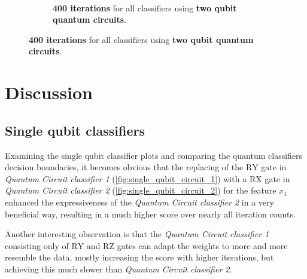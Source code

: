 \begin{figure}[!h]
    \\[1ex]
    \begin{subfigure}{1.0\textwidth}
        \centering
        \caption{\textbf{400 iterations} for all classifiers using \textbf{two qubit quantum circuits}.}
        \label{fig:2QubitClassifiers_400Iterations}
    \end{subfigure}
\end{figure}

\clearpage
\section{Discussion}

\subsection{Single qubit classifiers}
Examining the single qubit classifier plots and comparing the quantum classifiers decision boundaries, it becomes obvious that the replacing of the $\mathrm{RY}$ gate in \textit{Quantum Circuit classifier 1} (\ref{fig:single_qubit_circuit_1}) with a $\mathrm{RX}$ gate in \textit{Quantum Circuit classifier 2} (\ref{fig:single_qubit_circuit_2}) for the feature $x_1$ enhanced the expressiveness of the \textit{Quantum Circuit classifier 2} in a very beneficial way, resulting in a much higher score over nearly all iteration counts.

Another interesting observation is that the \textit{Quantum Circuit classifier 1} consisting only of $\mathrm{RY}$ and $\mathrm{RZ}$ gates can adapt the weights to more and more resemble the data, mostly increasing the score with higher iterations, but achieving this much slower than \textit{Quantum Circuit classifier 2}.

